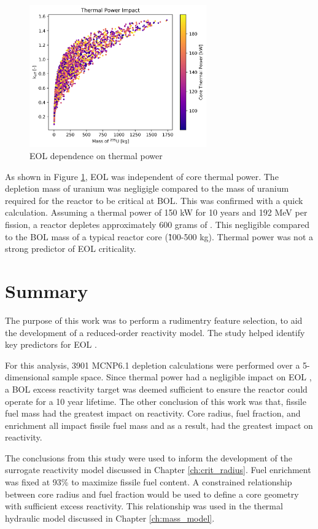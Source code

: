 \begin{figure}[h]
    \centering
    \includegraphics[width=3in]{../images/keff_vs_power.png}
\caption{EOL \keff dependence on thermal power}
\label{fig:eol_keff_vs_power}
\end{figure}

As shown in Figure \ref{fig:eol_keff_vs_power}, EOL \keff was independent of core
thermal power. The depletion mass of uranium was negligigle compared to the mass 
of uranium required for the reactor to be critical at BOL. This was confirmed
with a quick calculation. Assuming a thermal power of 150 kW for 10 years and
192 MeV per fission, a reactor depletes approximately 600 grams of \uran.
This negligible compared to the BOL mass of a typical reactor
core (\~100-500 kg). Thermal power was not a strong predictor of EOL criticality.

\section{Summary}
The purpose of this work was to perform a rudimentry feature
selection, to aid the development of a reduced-order reactivity
model. The study helped identify key predictors for EOL \keff.

For this analysis, 3901 MCNP6.1 depletion calculations were
performed over a 5-dimensional sample space. Since thermal power had a
negligible impact on EOL \keff, a BOL excess reactivity target was deemed 
sufficient to ensure the reactor could operate for a 10 year lifetime. 
The other conclusion of this work was that, fissile
fuel mass had the greatest impact on reactivity. Core radius,
fuel fraction, and enrichment all impact fissile fuel mass and as a result, had
the greatest impact on reactivity.

The conclusions from this study were used to inform the development of the
surrogate reactivity model discussed in Chapter \ref{ch:crit_radius}. Fuel
enrichment was fixed at 93\% to maximize fissile fuel content. A constrained relationship
between core radius and fuel fraction would be used to define a core geometry with
sufficient excess reactivity. This relationship was used in the
thermal hydraulic model discussed in Chapter \ref{ch:mass_model}.
